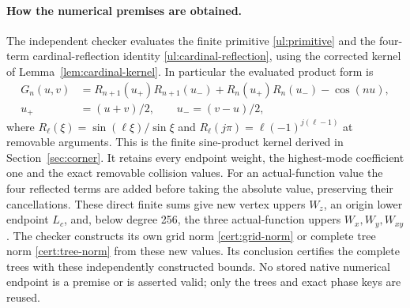 \paragraph{How the numerical premises are obtained.}
The independent checker evaluates the finite primitive
\eqref{ul:primitive} and the four-term cardinal-reflection identity
\eqref{ul:cardinal-reflection}, using the corrected kernel of
Lemma~\ref{lem:cardinal-kernel}. In particular the evaluated product form is
\[
\begin{aligned}
G_n(u,v)&=R_{n+1}(u_+)R_{n+1}(u_-)+R_n(u_+)R_n(u_-)-\cos(nu),\\
u_+&=(u+v)/2,\qquad u_-=(v-u)/2,
\end{aligned}
\]
where $R_\ell(\xi)=\sin(\ell\xi)/\sin\xi$ and
$R_\ell(j\pi)=\ell(-1)^{j(\ell-1)}$ at removable arguments.
This is the finite sine-product kernel derived in Section~\ref{sec:corner}.
It retains every endpoint weight, the
highest-mode coefficient one and the exact removable collision values.
For an actual-function value the four reflected terms are added before
taking the absolute value, preserving their cancellations. These direct
finite sums give new vertex uppers $W_z$, an origin lower endpoint $L_c$,
and, below degree 256, the three actual-function uppers
$W_x,W_y,W_{xy}$. The checker constructs its own grid norm \eqref{cert:grid-norm} or complete tree
norm \eqref{cert:tree-norm} from these new values. Its conclusion certifies the complete trees
with these independently constructed bounds. No stored native numerical
endpoint is a premise or is asserted valid; only the trees and exact
phase keys are reused.

